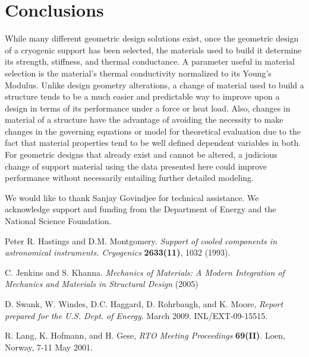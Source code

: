 \documentclass[final]{svjour2}
\begin{document}
{\section{Conclusions}
While many different geometric design solutions exist, once the geometric design of a cryogenic support has been selected, the materials used to build it determine its strength, stiffness, and thermal conductance. A parameter useful in material selection is the material's thermal conductivity normalized to its Young's Modulus.  Unlike design geometry alterations, a change of material used to build a structure tends to be a much easier and predictable way to improve upon a design in terms of its performance under a force or heat load. Also, changes in material of a structure have the advantage of avoiding the necessity to make changes in the governing equations or model for theoretical evaluation due to the fact that material properties tend to be well defined dependent variables in both. For geometric designs that already exist and cannot be altered, a judicious change of support material using the data presented here could improve performance without necessarily entailing further detailed modeling.

\begin{acknowledgements}
We would like to thank Sanjay Govindjee for technical assistance. We acknowledge support and funding from the Department of Energy and the National Science Foundation.
\end{acknowledgements}

\begin{thebibliography}{99}

Peter R. Hastings and D.M. Montgomery. {\it Support of cooled components in astronomical instruments. Cryogenics} \textbf{2633(11)}, 1032 (1993).

C. Jenkins and S. Khanna. {\it Mechanics of Materials: A Modern Integration of Mechanics and Materials in Structural Design} (2005)



D. Swank, W. Windes, D.C. Haggard, D. Rohrbaugh, and K. Moore, {\it Report prepared for the U.S. Dept. of Energy}. March 2009. INL/EXT-09-15515.

R. Lang, K. Hofmann, and H. Gese, {\it RTO Meeting Proceedings} \textbf{69(II)}. Loen, Norway, 7-11 May 2001.


\end{thebibliography}}
\end{document}
